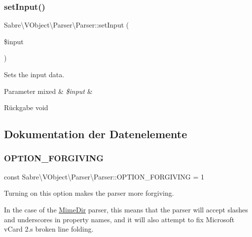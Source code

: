 \subsubsection{\texorpdfstring{set\+Input()}{setInput()}}
{\footnotesize\ttfamily Sabre\textbackslash{}\+V\+Object\textbackslash{}\+Parser\textbackslash{}\+Parser\+::set\+Input (\begin{DoxyParamCaption}\item[{}]{\$input }\end{DoxyParamCaption})\hspace{0.3cm}{\ttfamily [abstract]}}

Sets the input data.


\begin{DoxyParams}[1]{Parameter}
mixed & {\em \$input} & \\
\hline
\end{DoxyParams}
\begin{DoxyReturn}{Rückgabe}
void 
\end{DoxyReturn}


\subsection{Dokumentation der Datenelemente}
\mbox{\label{class_sabre_1_1_v_object_1_1_parser_1_1_parser_ae08bb9fb51b2482be33c876abc9114d3}} 
\subsubsection{\texorpdfstring{O\+P\+T\+I\+O\+N\+\_\+\+F\+O\+R\+G\+I\+V\+I\+NG}{OPTION\_FORGIVING}}
{\footnotesize\ttfamily const Sabre\textbackslash{}\+V\+Object\textbackslash{}\+Parser\textbackslash{}\+Parser\+::\+O\+P\+T\+I\+O\+N\+\_\+\+F\+O\+R\+G\+I\+V\+I\+NG = 1}

Turning on this option makes the parser more forgiving.

In the case of the \mbox{\hyperlink{class_sabre_1_1_v_object_1_1_parser_1_1_mime_dir}{Mime\+Dir}} parser, this means that the parser will accept slashes and underscores in property names, and it will also attempt to fix Microsoft v\+Card 2.\textquotesingle{}s broken line folding. 

